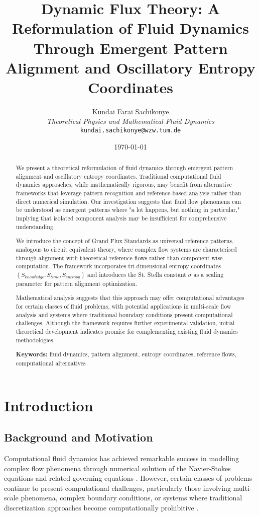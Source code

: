 \documentclass[12pt,a4paper]{article}
\title{\textbf{Dynamic Flux Theory: A Reformulation of Fluid Dynamics Through Emergent Pattern Alignment and Oscillatory Entropy Coordinates}}
\author{
Kundai Farai Sachikonye\\
\textit{Theoretical Physics and Mathematical Fluid Dynamics}\\
\texttt{kundai.sachikonye@wzw.tum.de}
}
\date{\today}
\begin{document}
\maketitle

\begin{abstract}
We present a theoretical reformulation of fluid dynamics through emergent pattern alignment and oscillatory entropy coordinates. Traditional computational fluid dynamics approaches, while mathematically rigorous, may benefit from alternative frameworks that leverage pattern recognition and reference-based analysis rather than direct numerical simulation. Our investigation suggests that fluid flow phenomena can be understood as emergent patterns where "a lot happens, but nothing in particular," implying that isolated component analysis may be insufficient for comprehensive understanding.

We introduce the concept of Grand Flux Standards as universal reference patterns, analogous to circuit equivalent theory, where complex flow systems are characterised through alignment with theoretical reference flows rather than component-wise computation. The framework incorporates tri-dimensional entropy coordinates $(S_{knowledge}, S_{time}, S_{entropy})$ and introduces the St. Stella constant $\sigma$ as a scaling parameter for pattern alignment optimization.

Mathematical analysis suggests that this approach may offer computational advantages for certain classes of fluid problems, with potential applications in multi-scale flow analysis and systems where traditional boundary conditions present computational challenges. Although the framework requires further experimental validation, initial theoretical development indicates promise for complementing existing fluid dynamics methodologies.

\textbf{Keywords:} fluid dynamics, pattern alignment, entropy coordinates, reference flows, computational alternatives
\end{abstract}

\section{Introduction}

\subsection{Background and Motivation}

Computational fluid dynamics has achieved remarkable success in modelling complex flow phenomena through numerical solution of the Navier-Stokes equations and related governing equations \cite{anderson1995computational}. However, certain classes of problems continue to present computational challenges, particularly those involving multi-scale phenomena, complex boundary conditions, or systems where traditional discretization approaches become computationally prohibitive \cite{pope2000turbulent}.
\end{document}
